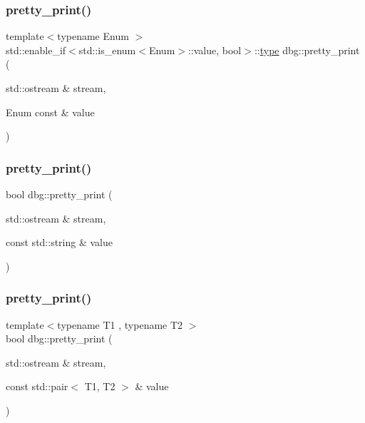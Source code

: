 \mbox{\label{namespacedbg_acd3034b7476cdf474e46eb2bbca6e0d1}} 
\subsubsection{\texorpdfstring{pretty\+\_\+print()}{pretty\_print()}\hspace{0.1cm}{\footnotesize\ttfamily [16/19]}}
{\footnotesize\ttfamily template$<$typename Enum $>$ \\
std\+::enable\+\_\+if$<$std\+::is\+\_\+enum$<$Enum$>$\+::value, bool$>$\+::\hyperlink{namespacedbg_a2365d80e3a3525e6025040383ff8661b}{type} dbg\+::pretty\+\_\+print (\begin{DoxyParamCaption}\item[{std\+::ostream \&}]{stream,  }\item[{Enum const \&}]{value }\end{DoxyParamCaption})\hspace{0.3cm}{\ttfamily [inline]}}

\mbox{\label{namespacedbg_ae620aa6031e088dc11e1df853e38f5fa}} 
\subsubsection{\texorpdfstring{pretty\+\_\+print()}{pretty\_print()}\hspace{0.1cm}{\footnotesize\ttfamily [17/19]}}
{\footnotesize\ttfamily bool dbg\+::pretty\+\_\+print (\begin{DoxyParamCaption}\item[{std\+::ostream \&}]{stream,  }\item[{const std\+::string \&}]{value }\end{DoxyParamCaption})\hspace{0.3cm}{\ttfamily [inline]}}

\mbox{\label{namespacedbg_adf02078069da78815c208dd638a01640}} 
\subsubsection{\texorpdfstring{pretty\+\_\+print()}{pretty\_print()}\hspace{0.1cm}{\footnotesize\ttfamily [18/19]}}
{\footnotesize\ttfamily template$<$typename T1 , typename T2 $>$ \\
bool dbg\+::pretty\+\_\+print (\begin{DoxyParamCaption}\item[{std\+::ostream \&}]{stream,  }\item[{const std\+::pair$<$ T1, T2 $>$ \&}]{value }\end{DoxyParamCaption})\hspace{0.3cm}{\ttfamily [inline]}}

